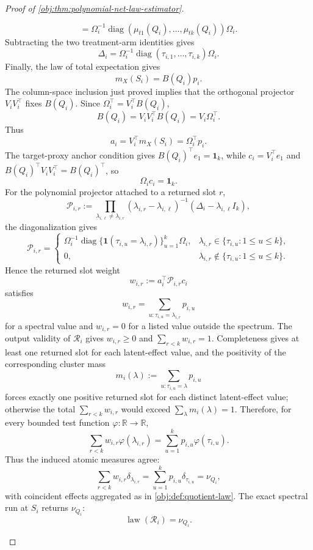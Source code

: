 \begin{proof}[Proof of \cref{obj:thm:polynomial-net-law-estimator}]
\begin{enumerate}
\[=
\Omega_i^{-1}
\operatorname{diag}(\mu_{t1}(Q_i),\ldots,\mu_{tk}(Q_i))\Omega_i .
\]
Subtracting the two treatment-arm identities gives
\[
\Delta_i
=
\Omega_i^{-1}
\operatorname{diag}(\tau_{i,1},\ldots,\tau_{i,k})
\Omega_i .
\]
Finally, the law of total expectation gives
\[
m_X(S_i)=B(Q_i)p_i .
\]
The column-space inclusion just proved implies that the orthogonal projector
\(V_iV_i^\top\) fixes \(B(Q_i)\).  Since
\(\Omega_i^\top=V_i^\top B(Q_i)\),
\[
B(Q_i)=V_iV_i^\top B(Q_i)=V_i\Omega_i^\top .
\]
Thus
\[
a_i=V_i^\top m_X(S_i)=\Omega_i^\top p_i .
\]
The target-proxy anchor condition gives \(B(Q_i)^\top e_1=\mathbf 1_k\), while
\(c_i=V_i^\top e_1\) and \(B(Q_i)^\top V_iV_i^\top=B(Q_i)^\top\), so
\[
\Omega_i c_i=\mathbf 1_k .
\] %
For the polynomial projector attached to a returned slot \(r\),
\[
\mathcal P_{i,r}
:=
\prod_{\lambda_{i,\ell}\ne\lambda_{i,r}}
(\lambda_{i,r}-\lambda_{i,\ell})^{-1}
(\Delta_i-\lambda_{i,\ell}I_k),
\]
the diagonalization gives
\[
\mathcal P_{i,r}
=
\begin{cases}
\Omega_i^{-1}
\operatorname{diag}\{\mathbf 1(\tau_{i,u}=\lambda_{i,r})\}_{u=1}^k
\Omega_i,
&\lambda_{i,r}\in\{\tau_{i,u}:1\le u\le k\},\\
0,&\lambda_{i,r}\notin\{\tau_{i,u}:1\le u\le k\}.
\end{cases}
\]
Hence the returned slot weight
\[
w_{i,r}:=a_i^\top\mathcal P_{i,r}c_i
\]
satisfies
\[
w_{i,r}
=
\sum_{u:\tau_{i,u}=\lambda_{i,r}}p_{i,u}
\]
for a spectral value and \(w_{i,r}=0\) for a listed value outside the spectrum.
The output validity of \(\mathcal R_i\) gives \(w_{i,r}\ge0\) and
\(\sum_{r<k}w_{i,r}=1\).  Completeness gives at least one returned slot for
each latent-effect value, and the positivity of the corresponding cluster mass
\[
m_i(\lambda):=\sum_{u:\tau_{i,u}=\lambda}p_{i,u}
\]
forces exactly one positive returned slot for each distinct latent-effect
value; otherwise the total \(\sum_{r<k}w_{i,r}\) would exceed
\(\sum_{\lambda}m_i(\lambda)=1\).  Therefore, for every bounded test function
\(\varphi:\mathbb R\to\mathbb R\),
\[
\sum_{r<k}w_{i,r}\varphi(\lambda_{i,r})
=
\sum_{u=1}^k p_{i,u}\varphi(\tau_{i,u}).
\]
Thus the induced atomic measures agree:
\[
\sum_{r<k}w_{i,r}\delta_{\lambda_{i,r}}
=
\sum_{u=1}^kp_{i,u}\delta_{\tau_{i,u}}
=
\nu_{Q_i},
\]
with coincident effects aggregated as in \cref{obj:def:quotient-law}.  The exact
spectral run at \(S_i\) returns \(\nu_{Q_i}\):
\begin{equation}
\operatorname{law}(\mathcal R_i)=\nu_{Q_i}.
\label{eq:finite-net-run-quotient}
\end{equation} %


\end{enumerate}
\end{proof}
